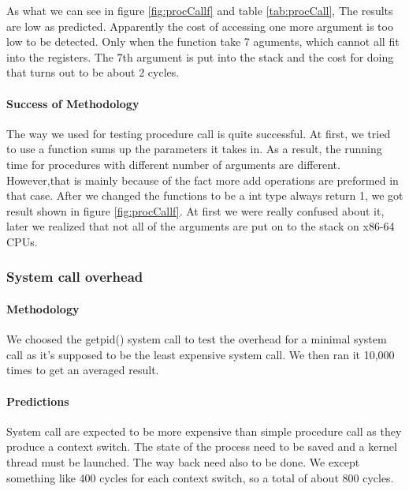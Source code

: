 As what we can see in figure \ref{fig:procCallf} and table \ref{tab:procCall}, The results are low as predicted. Apparently the cost of accessing one more argument is too low to be detected. Only when the function take 7 aguments, which cannot all fit into the registers. The 7th argument is put into the stack and the cost for doing that turns out to be about 2 cycles.

\paragraph{Success of Methodology}
The way we used for testing procedure call is quite successful. At first, we tried to use a function sums up the parameters it takes in. As a result, the running time for procedures with different number of arguments are different. However,that is mainly because of the fact more add operations are preformed in that case. After we changed the functions to be a int type always return 1, we got result shown in figure \ref{fig:procCallf}. At first we were really confused about it, later we realized that not all of the arguments are put on to the stack on x86-64 CPUs.







\subsubsection{System call overhead}
\paragraph{Methodology}
We choosed the getpid() system call to test the overhead for a minimal system
call as it's supposed to be the least expensive system call.
We then ran it 10,000 times to get an averaged result.

\paragraph{Predictions}
System call are expected to be more expensive than simple procedure call as they
produce a context switch.
The state of the process need to be saved and a kernel thread must be launched.
The way back need also to be done.
We except something like 400 cycles for each context switch, so a total of about 800 cycles.

